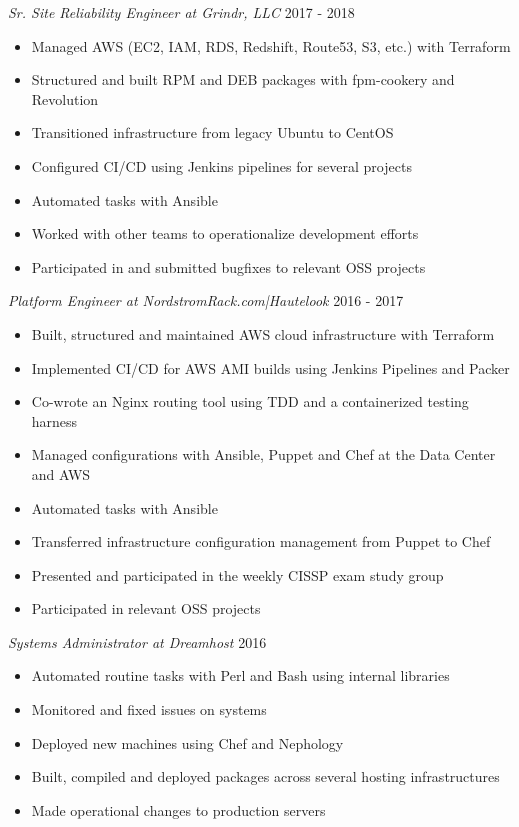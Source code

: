 \documentclass[line]{tex/res}
\begin{document}
\begin{resume}
    {\sl Sr. Site Reliability Engineer at Grindr, LLC} \hfill 2017 - 2018
    \begin{itemize} \itemsep -2pt %
        \item Managed AWS (EC2, IAM, RDS, Redshift, Route53, S3, etc.) with Terraform
        \item Structured and built RPM and DEB packages with fpm-cookery and Revolution
        \item Transitioned infrastructure from legacy Ubuntu to CentOS
        \item Configured CI/CD using Jenkins pipelines for several projects
        \item Automated tasks with Ansible
        \item Worked with other teams to operationalize development efforts
        \item Participated in and submitted bugfixes to relevant OSS projects
    \end{itemize}

    {\sl Platform Engineer at NordstromRack.com|Hautelook} \hfill 2016 - 2017
    \begin{itemize} \itemsep -2pt %
        \item Built, structured and maintained AWS cloud infrastructure with Terraform
        \item Implemented CI/CD for AWS AMI builds using Jenkins Pipelines and Packer
        \item Co-wrote an Nginx routing tool using TDD and a containerized testing harness
        \item Managed configurations with Ansible, Puppet and Chef at the Data Center and AWS
        \item Automated tasks with Ansible
        \item Transferred infrastructure configuration management from Puppet to Chef
        \item Presented and participated in the weekly CISSP exam study group
        \item Participated in relevant OSS projects
    \end{itemize}

    {\sl Systems Administrator at Dreamhost} \hfill 2016
    \begin{itemize} \itemsep -2pt
        \item Automated routine tasks with Perl and Bash using internal libraries
        \item Monitored and fixed issues on systems
        \item Deployed new machines using Chef and Nephology
        \item Built, compiled and deployed packages across several hosting infrastructures
        \item Made operational changes to production servers
    \end{itemize}


\end{resume}
\end{document}
